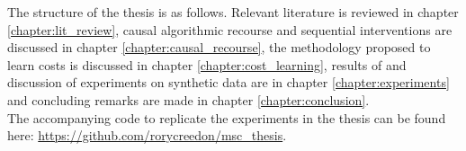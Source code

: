 The structure of the thesis is as follows. Relevant literature is reviewed in chapter \ref{chapter:lit_review}, causal algorithmic recourse and sequential interventions are discussed in chapter \ref{chapter:causal_recourse}, the methodology proposed to learn costs is discussed in chapter \ref{chapter:cost_learning}, results of and discussion of experiments on synthetic data are in chapter \ref{chapter:experiments} and concluding remarks are made in chapter \ref{chapter:conclusion}.\\

The accompanying code to replicate the experiments in the thesis can be found here: \url{https://github.com/rorycreedon/msc_thesis}.









